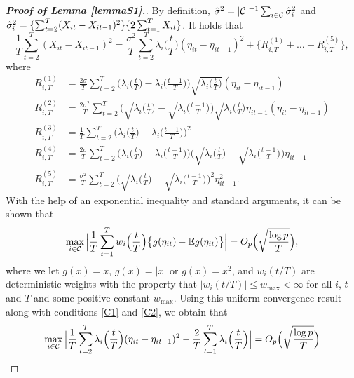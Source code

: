 \documentclass[a4paper,12pt]{article}
\numberwithin{equation}{section}
\begin{document}
\begin{proof}[\textnormal{\textbf{Proof of Lemma \ref{lemmaS1}.}}]
By definition, $\hat{\sigma}^2 = |\mathcal{C}|^{-1} \sum_{i \in \mathcal{C}} \hat{\sigma}_i^2$ and $\hat{\sigma}_i^2 = \{\sum_{t=2}^T (X_{it}-X_{it-1})^2\}\{2 \sum_{t=1}^T X_{it}\}$. It holds that 
\begin{equation}\label{eq:approxerror:claim3:expansion}
\frac{1}{T} \sum\limits_{t=2}^T (X_{it} - X_{it-1})^2 = \frac{\sigma^2}{T} \sum\limits_{t=2}^T \lambda_i\Big(\frac{t}{T}\Big) (\eta_{it} - \eta_{it-1})^2 + \big\{R_{i,T}^{(1)} + \ldots + R_{i,T}^{(5)}\big\},
\end{equation}
where
\begin{align*}
R_{i,T}^{(1)} & = \frac{2\sigma}{T} \sum\limits_{t=2}^T \Big( \lambda_i\Big(\frac{t}{T}\Big) - \lambda_i\Big(\frac{t-1}{T}\Big) \Big) \sqrt{\lambda_i\Big(\frac{t}{T}\Big)} (\eta_{it} - \eta_{it-1}) \\
R_{i,T}^{(2)} & = \frac{2\sigma^2}{T} \sum\limits_{t=2}^T \Big( \sqrt{\lambda_i\Big(\frac{t}{T}\Big)} - \sqrt{\lambda_i\Big(\frac{t-1}{T}\Big)} \Big) \sqrt{\lambda_i\Big(\frac{t}{T}\Big)} \eta_{it-1} (\eta_{it} - \eta_{it-1}) \\
R_{i,T}^{(3)} & = \frac{1}{T} \sum\limits_{t=2}^T \Big( \lambda_i\Big(\frac{t}{T}\Big) - \lambda_i\Big(\frac{t-1}{T}\Big) \Big)^2 \\
R_{i,T}^{(4)} & = \frac{2 \sigma}{T} \sum\limits_{t=2}^T \Big( \lambda_i\Big(\frac{t}{T}\Big) - \lambda_i\Big(\frac{t-1}{T}\Big) \Big) \Big( \sqrt{\lambda_i\Big(\frac{t}{T}\Big)} - \sqrt{\lambda_i\Big(\frac{t-1}{T}\Big)} \Big) \eta_{it-1} \\
R_{i,T}^{(5)} & = \frac{\sigma^2}{T} \sum\limits_{t=2}^T  \Big( \sqrt{\lambda_i\Big(\frac{t}{T}\Big)} - \sqrt{\lambda_i\Big(\frac{t-1}{T}\Big)} \Big)^2 \eta_{it-1}^2.
\end{align*} 
With the help of an exponential inequality and standard arguments, it can be shown that 
\[ \max_{i \in \mathcal{C}} \Big| \frac{1}{T} \sum_{t=1}^T w_i\Big(\frac{t}{T}\Big) \big\{ g(\eta_{it}) - \mathbb{E} g(\eta_{it}) \big\} \Big| = O_p\Big( \sqrt{\frac{\log p}{T}} \Big), \]
where we let $g(x) = x$, $g(x) = |x|$ or $g(x) = x^2$, and $w_i(t/T)$ are deterministic weights with the property that $|w_i(t/T)| \le w_{\max} < \infty$ for all $i$, $t$ and $T$ and some positive constant $w_{\max}$. Using this uniform convergence result along with conditions \ref{C1} and \ref{C2}, we obtain that 
\[ \max_{i \in \mathcal{C}} \Big| \frac{1}{T} \sum\limits_{t=2}^T \lambda_i\Big(\frac{t}{T}\Big) (\eta_{it} - \eta_{it-1})^2 - \frac{2}{T} \sum\limits_{t=1}^T \lambda_i\Big(\frac{t}{T}\Big) \Big| = O_p\Big( \sqrt{\frac{\log p}{T}} \Big) \]

\end{proof}
\end{document}
